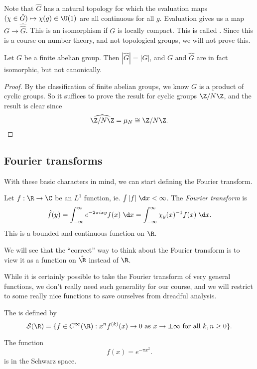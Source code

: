 \documentclass[a4paper]{article}
\begin{document}
Note that $\hat{G}$ has a natural topology for which the evaluation maps $(\chi \in \hat{G}) \mapsto \chi(g) \in \U(1)$ are all continuous for all $g$. Evaluation gives us a map $G \to \hat{\hat{G}}$. This is an isomorphism if $G$ is locally compact. This is called . Since this is a course on number theory, and not topological groups, we will not prove this.

\begin{prop}
  Let $G$ be a finite abelian group. Then $|\hat{G}| = |G|$, and $G$ and $\hat{G}$ are in fact isomorphic, but not canonically.
\end{prop}

\begin{proof}
  By the classification of finite abelian groups, we know $G$ is a product of cyclic groups. So it suffices to prove the result for cyclic groups $\Z/N\Z$, and the result is clear since
  \[
    \widehat{\Z/N\Z} = \mu_N \cong \Z/N\Z.
  \]
\end{proof}

\subsection{Fourier transforms}
With these basic characters in mind, we can start defining the Fourier transform.
\begin{defi}
  Let $f: \R \to \C$ be an $L^1$ function, ie. $\int |f| \;\d x < \infty$. The \emph{Fourier transform} is
  \[
    \hat{f}(y) = \int_{-\infty}^\infty e^{-2\pi i xy} f(x) \;\d x = \int_{-\infty}^\infty \chi_y(x)^{-1} f(x) \;\d x.
  \]
  This is a bounded and continuous function on $\R$.
\end{defi}
We will see that the ``correct'' way to think about the Fourier transform is to view it as a function on $\hat{\R}$ instead of $\R$.

While it is certainly possible to take the Fourier transform of very general functions, we don't really need such generality for our course, and we will restrict to some really nice functions to save ourselves from dreadful analysis.
\begin{defi}
  The  is defined by
  \[
    \mathcal{S}(\R) = \{f \in C^\infty(\R) : x^n f^{(k)}(x) \to 0\text{ as }x \to \pm\infty\text{ for all }k, n\geq 0\}.
  \]
\end{defi}

\begin{eg}
  The function
  \[
    f(x) = e^{-\pi x^2}.
  \]
  is in the Schwarz space.
\end{eg}
\end{document}
